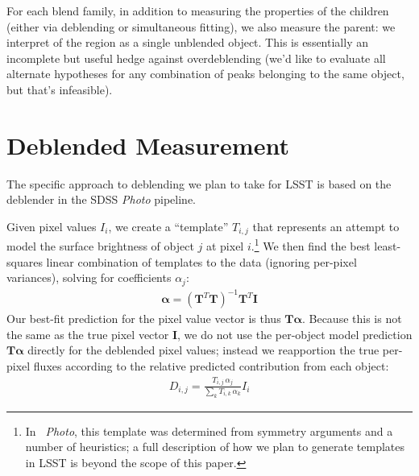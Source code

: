 \documentclass[10pt]{article}
\begin{document}
For each blend family, in addition to measuring the properties of the children
(either via deblending or simultaneous fitting), we also measure the parent:
we interpret of the region as a single unblended object. This is essentially
an incomplete but useful hedge against overdeblending (we'd like to evaluate
all alternate hypotheses for any combination of peaks belonging to the same
object, but that's infeasible).

\section{Deblended Measurement}

\label{sec:deblender}

The specific approach to deblending we plan to take for LSST is based on
the deblender in the SDSS {\em Photo} pipeline.

Given pixel values $I_{i}$, we create a ``template'' $T_{i,j}$ that represents
an attempt to model the surface brightness of object $j$ at pixel
$i$.\footnote {
    In {\em~Photo}, this template was determined from symmetry arguments and a
    number of heuristics; a full description of how we plan to generate
    templates in LSST is beyond the scope of this paper.
}  We then find the best least-squares linear combination of templates to the
data (ignoring per-pixel variances), solving for coefficients $\alpha_{j}$:
\begin{align}
\bm{\alpha} = \left(\bm{T}^T\bm{T}\right)^{-1}\!\bm{T}^T\bm{I}
\end{align}
Our best-fit prediction for the pixel value vector is thus
$\bm{T}\bm{\alpha}$.
Because this is not the same as the true pixel vector $\bm{I}$, we do not use
the per-object model prediction $\bm{T}\bm{\alpha}$ directly for the deblended
pixel values; instead we reapportion the true per-pixel fluxes according to
the relative predicted contribution from each object:
\begin{align}
D_{i,j} = \frac{
    T_{i,j} \, \alpha_j
}{
    \sum\limits_k T_{i,k} \, \alpha_k
}
I_i
\end{align}
\end{document}
